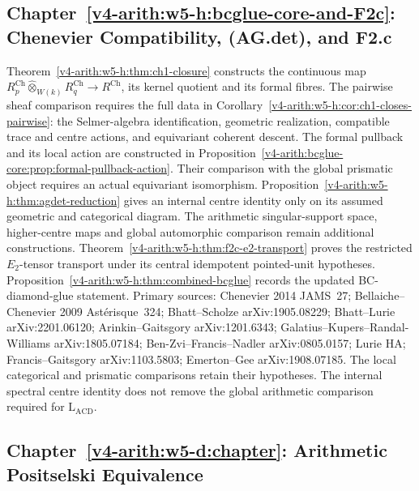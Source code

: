 \subsection{Chapter~\ref{v4-arith:w5-h:bcglue-core-and-F2c}: Chenevier Compatibility, (AG.det), and F2.c}
\label{v4-arith:w5-synth:ch52}

Theorem~\ref{v4-arith:w5-h:thm:ch1-closure} constructs the continuous map
$R_p^{\mathrm{Ch}}\widehat\otimes_{W(k)}R_q^{\mathrm{Ch}}
\to R^{\mathrm{Ch}}$, its kernel quotient and its formal fibres.
The pairwise sheaf comparison requires the full data in
Corollary~\ref{v4-arith:w5-h:cor:ch1-closes-pairwise}:
the Selmer-algebra identification, geometric realization, compatible
trace and centre actions, and equivariant coherent descent.
The formal pullback and its local action are constructed in
Proposition~\ref{v4-arith:bcglue-core:prop:formal-pullback-action}.
Their comparison with the global prismatic object requires an
actual equivariant isomorphism.
Proposition~\ref{v4-arith:w5-h:thm:agdet-reduction} gives an internal
centre identity only on its assumed geometric and categorical
diagram. The arithmetic singular-support space, higher-centre maps
and global automorphic comparison remain additional constructions.
Theorem~\ref{v4-arith:w5-h:thm:f2c-e2-transport}
proves the restricted \(E_{2}\)-tensor transport under its central
idempotent pointed-unit hypotheses.
Proposition~\ref{v4-arith:w5-h:thm:combined-bcglue} records the updated
BC-diamond-glue statement.
Primary sources: Chenevier 2014 JAMS~27; Bellaiche--Chenevier 2009
Ast\'erisque~324; Bhatt--Scholze arXiv:1905.08229; Bhatt--Lurie
arXiv:2201.06120; Arinkin--Gaitsgory arXiv:1201.6343;
Galatius--Kupers--Randal-Williams arXiv:1805.07184;
Ben-Zvi--Francis--Nadler arXiv:0805.0157; Lurie HA;
Francis--Gaitsgory arXiv:1103.5803; Emerton--Gee arXiv:1908.07185.
The local categorical and prismatic comparisons retain their
hypotheses. The internal spectral centre identity does not remove
the global arithmetic comparison required for
$\mathrm{L}_{\mathrm{ACD}}$.

\subsection{Chapter~\ref{v4-arith:w5-d:chapter}: Arithmetic Positselski Equivalence}
\label{v4-arith:w5-synth:ch54}

